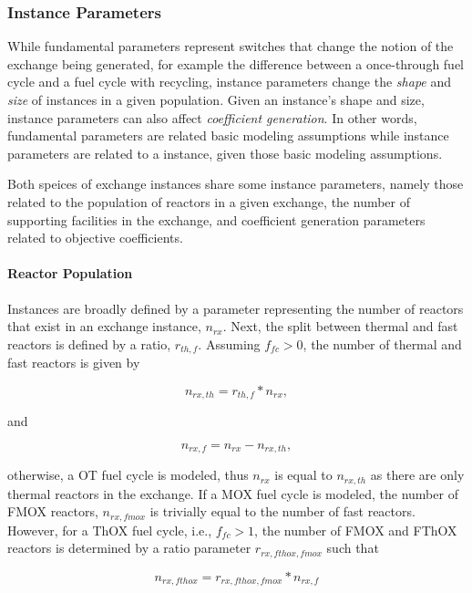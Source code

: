 \subsubsection{Instance Parameters}

While fundamental parameters represent switches that change the notion of the
exchange being generated, for example the difference between a once-through fuel
cycle and a fuel cycle with recycling, instance parameters change the
\textit{shape} and \textit{size} of instances in a given population. Given an
instance's shape and size, instance parameters can also affect
\textit{coefficient generation}. In other words, fundamental parameters are
related basic modeling assumptions while instance parameters are related to a
instance, given those basic modeling assumptions.

Both speices of exchange instances share some instance parameters, namely those
related to the population of reactors in a given exchange, the number of
supporting facilities in the exchange, and coefficient generation parameters
related to objective coefficients.

\paragraph{Reactor Population}

Instances are broadly defined by a parameter representing the number of reactors
that exist in an exchange instance, $n_{rx}$. Next, the split between thermal
and fast reactors is defined by a ratio, $r_{th, f}$. Assuming $f_{fc} > 0$, the
number of thermal and fast reactors is given by

\begin{equation}
n_{rx, th} = r_{th, f} * n_{rx},
\end{equation}

and 

\begin{equation}
n_{rx, f} = n_{rx} - n_{rx, th},
\end{equation}

otherwise, a OT fuel cycle is modeled, thus $n_{rx}$ is equal to $n_{rx, th}$ as
there are only thermal reactors in the exchange. If a MOX fuel cycle is modeled,
the number of FMOX reactors, $n_{rx, fmox}$ is trivially equal to the number of
fast reactors. However, for a ThOX fuel cycle, i.e., $f_{fc} > 1$, the number of
FMOX and FThOX reactors is determined by a ratio parameter $r_{rx, fthox, fmox}$
such that 

\begin{equation}
n_{rx, fthox} = r_{rx, fthox, fmox} * n_{rx, f}
\end{equation}

